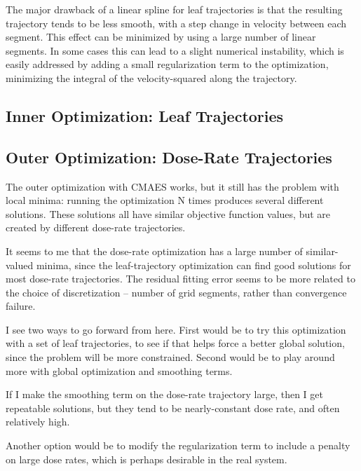The major drawback of a linear spline for leaf trajectories is that the resulting trajectory tends
to be less smooth, with a step change in velocity between each segment. This effect can be minimized
by using a large number of linear segments. In some cases this can lead to a slight numerical
instability, which is easily addressed by adding a small regularization term to the optimization,
minimizing the integral of the velocity-squared along the trajectory.


\subsection{Inner Optimization:  Leaf Trajectories}



\subsection{Outer Optimization:  Dose-Rate Trajectories}


The outer optimization with CMAES works, but it still has the problem with local minima:
running the optimization N times produces several different solutions.
These solutions all have similar objective function values, but are created by different
dose-rate trajectories.

It seems to me that the dose-rate optimization has a large number of similar-valued minima,
since the leaf-trajectory optimization can find good solutions for most dose-rate trajectories.
The residual fitting error seems to be more related to the choice of discretization -- number of
grid segments, rather than convergence failure.

I see two ways to go forward from here. First would be to try this optimization with a set of
leaf trajectories, to see if that helps force a better global solution, since the problem will
be more constrained. Second would be to play around more with global optimization and smoothing
terms.

If I make the smoothing term on the dose-rate trajectory large, then I get repeatable solutions,
but they tend to be nearly-constant dose rate, and often relatively high.

Another option would be to modify the regularization term to include a  penalty on large
dose rates, which is perhaps desirable in the real system.

